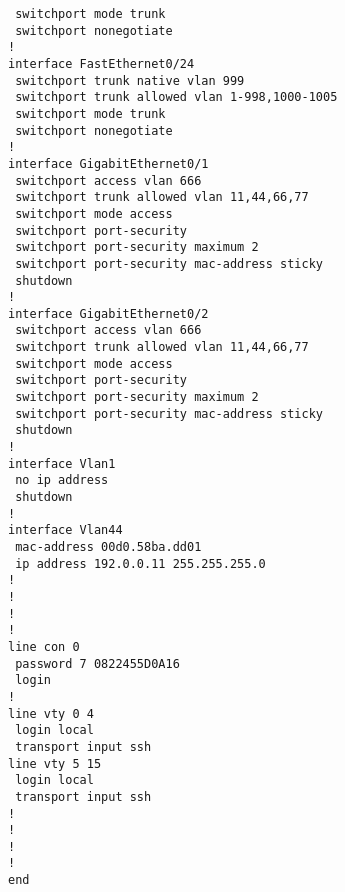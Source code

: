 \begin{verbatim}
 switchport mode trunk
 switchport nonegotiate
!
interface FastEthernet0/24
 switchport trunk native vlan 999
 switchport trunk allowed vlan 1-998,1000-1005
 switchport mode trunk
 switchport nonegotiate
!
interface GigabitEthernet0/1
 switchport access vlan 666
 switchport trunk allowed vlan 11,44,66,77
 switchport mode access
 switchport port-security
 switchport port-security maximum 2
 switchport port-security mac-address sticky 
 shutdown
!
interface GigabitEthernet0/2
 switchport access vlan 666
 switchport trunk allowed vlan 11,44,66,77
 switchport mode access
 switchport port-security
 switchport port-security maximum 2
 switchport port-security mac-address sticky 
 shutdown
!
interface Vlan1
 no ip address
 shutdown
!
interface Vlan44
 mac-address 00d0.58ba.dd01
 ip address 192.0.0.11 255.255.255.0
!
!
!
!
line con 0
 password 7 0822455D0A16
 login
!
line vty 0 4
 login local
 transport input ssh
line vty 5 15
 login local
 transport input ssh
!
!
!
!
end
\end{verbatim}


\clearpage
